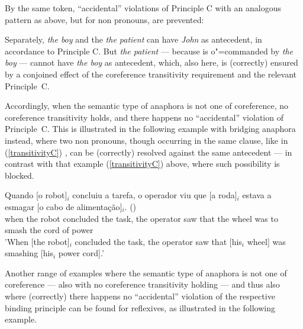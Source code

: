 \documentclass[output=paper
	        ,collection
	        ,collectionchapter
 	        ,biblatex
                ,babelshorthands
                ,newtxmath
                ,draftmode
                ,colorlinks, citecolor=brown
]{langscibook}
\begin{document}
By the same token, ``accidental'' violations of Principle C 
with an analogous pattern as above, but for non pronouns, are prevented:

 \begin{exe}
\label{transitivityC}
\end{exe}

Separately, {\em the boy} and the {\em the patient} can have {\em John} as antecedent, in accordance
to Principle C. 
But {\em the patient} --- because is o"=commanded by {\em the boy} --- cannot have {\em the boy} as antecedent, 
which, also here, is (correctly) ensured by a conjoined 
effect of the coreference transitivity requirement and the relevant Principle~C.

Accordingly, when the semantic type of anaphora is not one of coreference,
no coreference transitivity holds, and there happens no ``accidental'' violation of Principle~C.
This is illustrated in the following example with bridging anaphora instead,
where two non pronouns, though occurring in the same clause, like in (\ref{transitivityC}) , can be (correctly) resolved against 
the same antecedent --- in contrast with that example (\ref{transitivityC}) above, where such possibility is blocked.

\begin{exe}
\ex
\gll Quando [o robot]$_{i}$ concluiu a tarefa, o operador viu que [a roda]$_{i}$ estava a esmagar [o cabo de alimenta\c{c}\~ao]$_{i}$. ()\\ 
when the robot concluded the task, the operator saw that the wheel was to smash the cord of power\\
\trans 'When [the robot]$_{i}$ concluded the task, the operator saw that [his$_{i}$ wheel] was smashing [his$_{i}$ power cord].'
\end{exe}

Another range of examples where the semantic type of anaphora is not one of coreference --- also with
no coreference transitivity holding --- and thus also where (correctly) there happens no ``accidental'' violation
of the respective binding principle can be found for reflexives, as illustrated in the following example.

 \begin{exe}
 \label{accidentalReflexives}
\end{exe}
\end{document}
